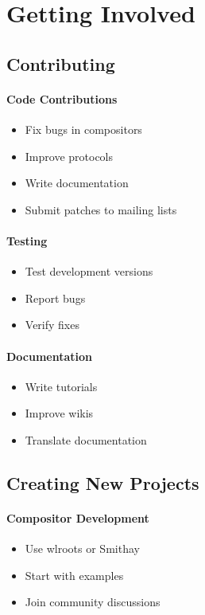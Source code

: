\section{Getting Involved}

\subsection{Contributing}

\paragraph{Code Contributions}
\begin{itemize}
    \item Fix bugs in compositors
    \item Improve protocols
    \item Write documentation
    \item Submit patches to mailing lists
\end{itemize}

\paragraph{Testing}
\begin{itemize}
    \item Test development versions
    \item Report bugs
    \item Verify fixes
\end{itemize}

\paragraph{Documentation}
\begin{itemize}
    \item Write tutorials
    \item Improve wikis
    \item Translate documentation
\end{itemize}

\subsection{Creating New Projects}

\paragraph{Compositor Development}
\begin{itemize}
    \item Use wlroots or Smithay
    \item Start with examples
    \item Join community discussions
\end{itemize}

